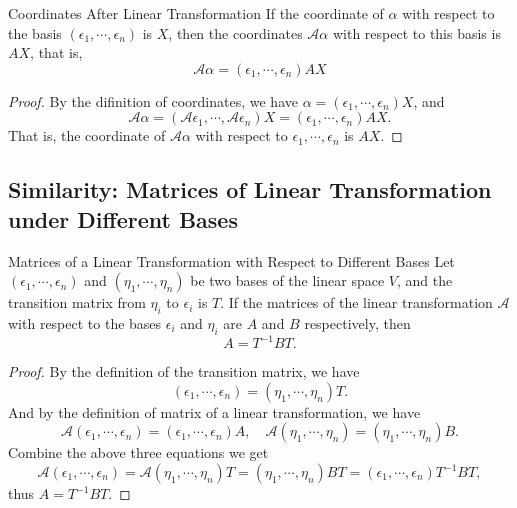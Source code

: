 \begin{proposition}{Coordinates After Linear Transformation}{}
  If the coordinate of $\alpha$ with respect to the basis
  $(\epsilon_1,\cdots,\epsilon_n)$ is $X$,
  then the coordinates $\mathcal{A}\alpha$ with respect to this basis is $AX$,
  that is,
  \begin{equation}
    \mathcal{A}\alpha = (\epsilon_1,\cdots,\epsilon_n)AX
  \end{equation}
\end{proposition}

\begin{proof}
  By the difinition of coordinates, we have $\alpha =
  (\epsilon_1,\cdots,\epsilon_n)X$,
  and
  \begin{equation}
    \mathcal{A}\alpha = (\mathcal{A}\epsilon_1,\cdots,\mathcal{A}\epsilon_n)X = (\epsilon_1,\cdots,\epsilon_n)AX.
  \end{equation}
  That is, the coordinate of $\mathcal{A}\alpha$ with respect to
  $\epsilon_1,\cdots,\epsilon_n$ is $AX$.
\end{proof}

\subsection{Similarity: Matrices of Linear Transformation under Different Bases}

\begin{theorem}{Matrices of a Linear Transformation with Respect to Different Bases}{}
  Let $(\epsilon_1,\cdots,\epsilon_n)$ and $(\eta_1,\cdots,\eta_n)$ be two bases
  of the linear space $V$,
  and the transition matrix from $\eta_i$ to $\epsilon_i$ is $T$.
  If the matrices of the linear transformation $\mathcal{A}$ with respect to the
  bases $\epsilon_i$ and $\eta_i$ are $A$ and $B$ respectively, then
  \begin{equation}
    A = T^{-1}BT.
  \end{equation}
\end{theorem}

\begin{proof}
  By the definition of the transition matrix, we have
  \begin{equation}
    (\epsilon_1,\cdots,\epsilon_n) = (\eta_1,\cdots,\eta_n)T.
  \end{equation}
  And by the definition of matrix of a linear transformation, we have
  \begin{equation}
    \mathcal{A}(\epsilon_1,\cdots,\epsilon_n) = (\epsilon_1,\cdots,\epsilon_n) A, \quad
    \mathcal{A}(\eta_1,\cdots,\eta_n) = (\eta_1,\cdots,\eta_n)B.
  \end{equation}
  Combine the above three equations we get
  \begin{equation}
    \mathcal{A}(\epsilon_1,\cdots,\epsilon_n) = \mathcal{A}(\eta_1,\cdots,\eta_n)T = (\eta_1,\cdots,\eta_n)BT
    = (\epsilon_1,\cdots,\epsilon_n)T^{-1}BT,
  \end{equation}
  thus $A = T^{-1}BT$.
\end{proof}


